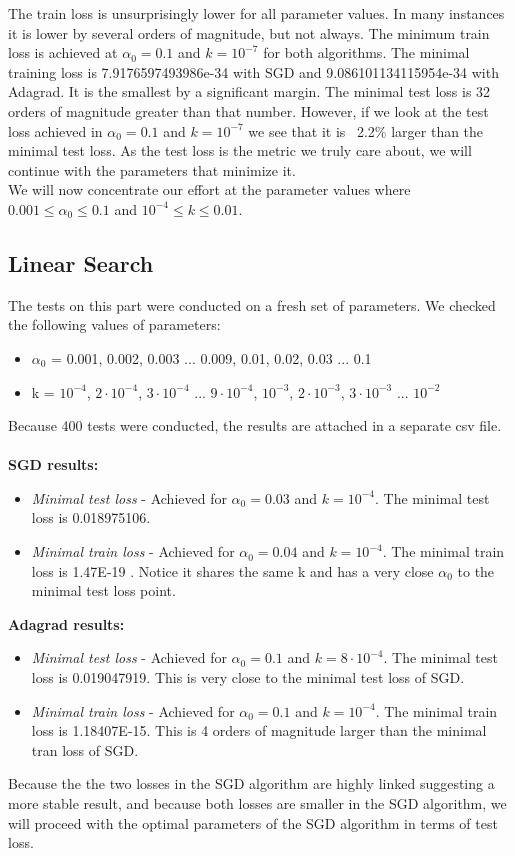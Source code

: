 \documentclass[12pt]{scrartcl}
\begin{document}
The train loss is unsurprisingly lower for all parameter values. In many instances it is lower by several orders of magnitude, but not always. The minimum train loss is achieved at $\alpha_0=0.1$ and $k=10^{-7}$ for both algorithms. The minimal training loss is 7.9176597493986e-34 with SGD and 9.086101134115954e-34 with Adagrad. It is the smallest by a significant margin. The minimal test loss is 32 orders of magnitude greater than that number. However, if we look at the test loss achieved in $\alpha_0=0.1$ and $k=10^{-7}$ we see that it is ~2.2\% larger than the minimal test loss. As the test loss is the metric we truly care about, we will continue with the parameters that minimize it.\\

We will now concentrate our effort at the parameter values where $0.001 \leq \alpha_0 \leq 0.1$ and $10^{-4} \leq k \leq 0.01$.

\subsection{Linear Search}
The tests on this part were conducted on a fresh set of parameters. We checked the following values of parameters:
\begin{itemize}
\item $\alpha_0$ = 0.001, 0.002, 0.003 ... 0.009, 0.01, 0.02, 0.03 ... 0.1
\item k = $10^{-4}$, $2 \cdot 10^{-4}$, $3 \cdot 10^{-4}$ ... $9 \cdot 10^{-4}$, $10^{-3}$, $2 \cdot 10^{-3}$, $3 \cdot 10^{-3}$ ... $10^{-2}$
\end{itemize}

Because 400 tests were conducted, the results are attached in a separate csv file.\\\\
\textbf{SGD results:}
\begin{itemize}
\item \textit{Minimal test loss} - Achieved for $\alpha_0 = 0.03$ and $k=10^{-4}$. The minimal test loss is 0.018975106.
\item \textit{Minimal train loss} - Achieved for $\alpha_0 = 0.04$ and $k=10^{-4}$. The minimal train loss is 1.47E-19
. Notice it shares the same k and has a very close $\alpha_0$ to the minimal test loss point.
\end{itemize}

\textbf{Adagrad results:}
\begin{itemize}
\item \textit{Minimal test loss} - Achieved for $\alpha_0 = 0.1$ and $k=8\cdot 10^{-4}$. The minimal test loss is 0.019047919. This is very close to the minimal test loss of SGD.
\item \textit{Minimal train loss} - Achieved for $\alpha_0 = 0.1$ and $k=10^{-4}$. The minimal train loss is 1.18407E-15. This is 4 orders of magnitude larger than the minimal tran loss of SGD.
\end{itemize}
Because the the two losses in the SGD algorithm are highly linked suggesting a more stable result, and because both losses are smaller in the SGD algorithm, we will proceed with the optimal parameters of the SGD algorithm in terms of test loss.
\end{document}
